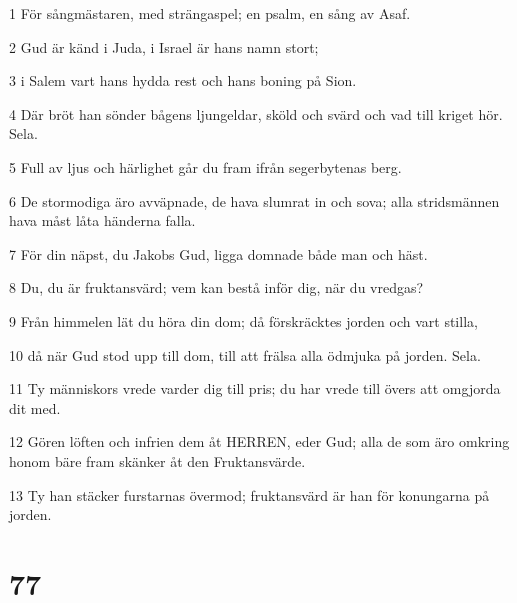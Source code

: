 \par 1 För sångmästaren, med strängaspel; en psalm, en sång av Asaf.
\par 2 Gud är känd i Juda, i Israel är hans namn stort;
\par 3 i Salem vart hans hydda rest och hans boning på Sion.
\par 4 Där bröt han sönder bågens ljungeldar, sköld och svärd och vad till kriget hör. Sela.
\par 5 Full av ljus och härlighet går du fram ifrån segerbytenas berg.
\par 6 De stormodiga äro avväpnade, de hava slumrat in och sova; alla stridsmännen hava måst låta händerna falla.
\par 7 För din näpst, du Jakobs Gud, ligga domnade både man och häst.
\par 8 Du, du är fruktansvärd; vem kan bestå inför dig, när du vredgas?
\par 9 Från himmelen lät du höra din dom; då förskräcktes jorden och vart stilla,
\par 10 då när Gud stod upp till dom, till att frälsa alla ödmjuka på jorden. Sela.
\par 11 Ty människors vrede varder dig till pris; du har vrede till övers att omgjorda dit med.
\par 12 Gören löften och infrien dem åt HERREN, eder Gud; alla de som äro omkring honom bäre fram skänker åt den Fruktansvärde.
\par 13 Ty han stäcker furstarnas övermod; fruktansvärd är han för konungarna på jorden.

\chapter{77}

